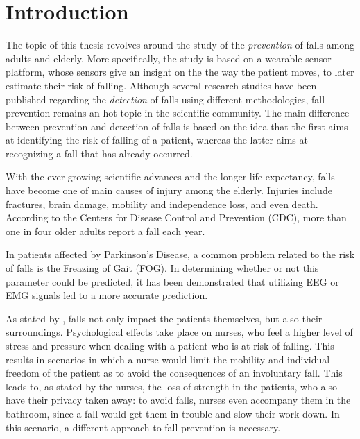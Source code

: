 \section{Introduction}
The topic of this thesis revolves around the study of the \textit{prevention} of falls among adults and elderly. More specifically, the study is based on a wearable sensor platform, whose sensors give an insight on the the way the patient moves, to later estimate their risk of falling. 
Although several research studies have been published regarding the \textit{detection} of falls using different methodologies, fall prevention remains an hot topic in the scientific community. The main difference between prevention and detection of falls is based on the idea that the first aims at identifying the risk of falling of a patient, whereas the latter aims at recognizing a fall that has already occurred.

With the ever growing scientific advances and the longer life expectancy, falls have become one of main causes of injury among the elderly. 
Injuries include fractures, brain damage, mobility and independence loss, and even death. According to the Centers for Disease Control and Prevention (CDC), more than one in four older adults report a fall each year. 

In patients affected by Parkinson's Disease, a common problem related to the risk of falls is the Freazing of Gait (FOG). In determining whether or not this parameter could be predicted, it has been demonstrated that utilizing EEG or EMG signals led to a more accurate prediction. 

As stated by \cite{ImpactFallNurses}, falls not only impact the patients themselves, but also their surroundings. Psychological effects take place on nurses, who feel a higher level of stress and pressure when dealing with a patient who is at risk of falling. This results in scenarios in which a nurse would limit the mobility and individual freedom of the patient as to avoid the consequences of an involuntary fall. This leads to, as stated by the nurses, the loss of strength in the patients, who also have their privacy taken away: to avoid falls, nurses even accompany them in the bathroom, since a fall would get them in trouble and slow their work down. 
In this scenario, a different approach to fall prevention is necessary.

